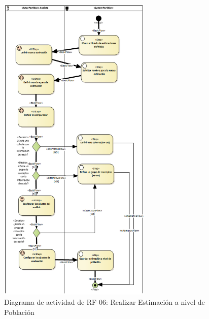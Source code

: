 \begin{figure}[H]
    \centering
    \includegraphics[width=0.65\textwidth]{figures/FR06.png}
    \caption{Diagrama de actividad de RF-06: Realizar Estimación a nivel de Población}
    \label{fig:FR06}
\end{figure}

